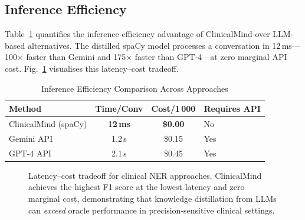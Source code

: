 \documentclass[conference]{IEEEtran}
\begin{document}
\subsection{Inference Efficiency}

Table~\ref{tab:efficiency} quantifies the inference efficiency advantage of
ClinicalMind over LLM-based alternatives. The distilled spaCy model processes
a conversation in 12\,ms—100$\times$ faster than Gemini and 175$\times$ faster
than GPT-4—at zero marginal API cost. Fig.~\ref{fig:efficiency} visualises this
latency–cost tradeoff.

\begin{table}[t]
\centering
\caption{Inference Efficiency Comparison Across Approaches}
\label{tab:efficiency}
\begin{tabular}{lccl}
\toprule
\textbf{Method} & \textbf{Time/Conv} & \textbf{Cost/1\,000} & \textbf{Requires API} \\
\midrule
ClinicalMind (spaCy) & \textbf{12\,ms}  & \textbf{\$0.00} & No  \\
Gemini API           &  1.2\,s           & \$0.15          & Yes \\
GPT-4 API            &  2.1\,s           & \$0.45          & Yes \\
\bottomrule
\end{tabular}
\end{table}

\begin{figure}[t]
\centering
{}
\caption{Latency–cost tradeoff for clinical NER approaches. ClinicalMind
achieves the highest F1 score at the lowest latency and zero marginal cost,
demonstrating that knowledge distillation from LLMs can \emph{exceed} oracle
performance in precision-sensitive clinical settings.}
\label{fig:efficiency}
\end{figure}
\end{document}
